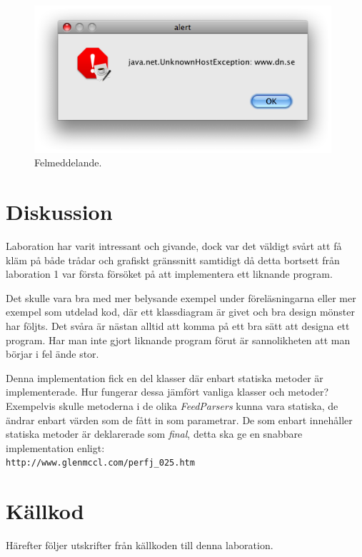 \documentclass[titlepage, twoside, a4paper, 12pt]{article}
\begin{document}
\begin{figure}[!hbp]
  \begin{center}
    \includegraphics[width=110mm]{images/error-msg-out.png}
    \caption{Felmeddelande.}
    \label{fig:error-msg}
  \end{center}
\end{figure}

\section{Diskussion}\label{Diskussion}
Laboration har varit intressant och givande, dock var det väldigt
svårt att få kläm på både trådar och grafiskt gränssnitt samtidigt då
detta bortsett från laboration 1 var första försöket på att
implementera ett liknande program.

Det skulle vara bra med mer belysande exempel under föreläsningarna
eller mer exempel som utdelad kod, där ett klassdiagram är givet och
bra design mönster har följts. Det svåra är nästan alltid att komma på
ett bra sätt att designa ett program. Har man inte gjort liknande
program förut är sannolikheten att man börjar i fel ände stor.

Denna implementation fick en del klasser där enbart statiska metoder
är implementerade. Hur fungerar dessa jämfört vanliga klasser och
metoder? Exempelvis skulle metoderna i de olika \textit{FeedParsers}
kunna vara statiska, de ändrar enbart värden som de fått in som
parametrar. De som enbart innehåller statiska metoder är deklarerade
som \textit{final}, detta ska ge en snabbare
implementation enligt:\\
\verb!http://www.glenmccl.com/perfj_025.htm!\\

\newpage
\appendix
{}
\section{Källkod}\label{Kallkod}
Härefter följer utskrifter från källkoden till denna laboration.
\end{document}
